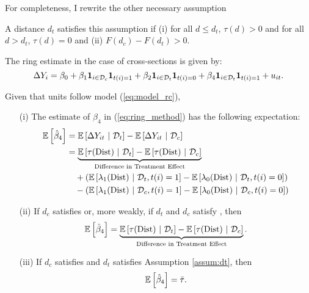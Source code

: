 \documentclass[10pt]{article}
\newcommand{\dist}{\text{Dist}}
\begin{document}
For completeness, I rewrite the other necessary assumption
\begin{assumption}[Correct $d_t$]\label{assum:dt}
    A distance $d_t$ satisfies this assumption if (i) for all $d \leq d_t$, $\tau(d) > 0$ and for all $d > d_t$, $\tau(d) = 0$ and (ii) $F(d_c) - F(d_t) > 0$.
\end{assumption}

The ring estimate in the case of cross-sections is given by:
\begin{equation}\label{eq:ring_method}
    \Delta Y_{i} = \beta_0 + \beta_1 \mathbf{1}_{i \in \mathcal{D}_c} \mathbf{1}_{t(i) = 1} + \beta_2 \mathbf{1}_{i \in \mathcal{D}_t} \mathbf{1}_{t(i) = 0} + \beta_4 \mathbf{1}_{i \in \mathcal{D}_t} \mathbf{1}_{t(i) = 1} + u_{it}.
\end{equation}

\begin{proposition}\label{prop:ring_decomp_rc}  
    Given that units follow model (\ref{eq:model_rc}),
    \begin{enumerate}
        \item[(i)] The estimate of $\beta_4$ in (\ref{eq:ring_method}) has the following expectation:
        \begin{align*}
            \expec{\hat{\beta}_4} &= \condexpec{\Delta Y_{it}}{\mathcal{D}_t} - \condexpec{\Delta Y_{it}}{\mathcal{D}_c} \\
            &=  \underbrace{\condexpec{\tau(\dist)}{\mathcal{D}_t} - \condexpec{\tau(\dist)}{\mathcal{D}_c} }_{\text{Difference in Treatment Effect}} \\
            &\quad + ( \condexpec{\lambda_1(\dist)}{\mathcal{D}_t, t(i) = 1} - \condexpec{\lambda_0(\dist)}{\mathcal{D}_t, t(i) = 0} ) \\
            &\quad - ( \condexpec{\lambda_1(\dist)}{\mathcal{D}_c, t(i) = 1} - \condexpec{\lambda_0(\dist)}{\mathcal{D}_c, t(i) = 0} )   \\
        \end{align*}
        
        \item[(ii)] If $d_c$ satisfies  or, more weakly, if $d_t$ and $d_c$ satisfy , then
        \[ 
            \expec{\hat{\beta}_4} = 
            \underbrace{\condexpec{\tau(\dist)}{\mathcal{D}_t} - \condexpec{\tau(\dist)}{\mathcal{D}_c} }_{\text{Difference in Treatment Effect}}.
        \] 
    
        \item[(iii)] If $d_c$ satisfies  and $d_t$ satisfies Assumption \ref{assum:dt}, then
        \[ 
            \mathbb{E}\left[\hat{\beta}_4\right] = \bar{\tau}.
        \]
    \end{enumerate}
\end{proposition}
\end{document}

